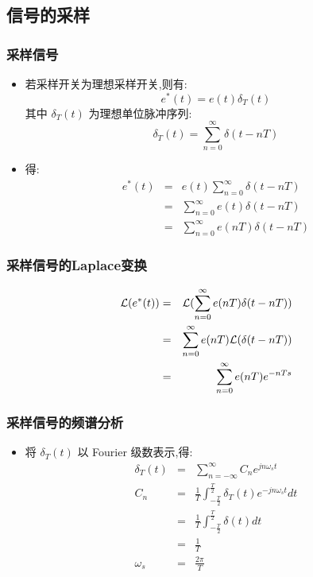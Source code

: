 \documentclass[table]{article}
\begin{document}
\subsection{信号的采样}
\label{sec-2-1}
\begin{frame}
\frametitle{采样信号}
\label{sec-2-1-1}

\begin{itemize}
\item <2->若采样开关为理想采样开关,则有:  
       	\[e^*(t)=e(t)\delta_T(t)\]
      其中  $\delta_T(t)$  为理想单位脉冲序列:  
	       \[\delta_T(t)=\sum_{n=0}^{\infty}\delta(t-nT)\]
\item <3->得:
      \begin{eqnarray*}
      e^{*}(t) & = & e(t)\sum_{n=0}^{\infty}\delta(t-nT) \\
       	&=&  \sum_{n=0}^{\infty}e(t)\delta(t-nT) \\
       	&=&  \sum_{n=0}^{\infty}e(nT)\delta(t-nT) 
      \end{eqnarray*}
\end{itemize}
\end{frame}
\begin{frame}
\frametitle{采样信号的Laplace变换}
\label{sec-2-1-2}

      \begin{eqnarray*}
      {\cal L}(e^{*}(t)) & =  & {\cal L}( \sum_{n=0}^{\infty}e(nT)\delta(t-nT) )\\
      &=&  \sum_{n=0}^{\infty}e(nT){\cal L}(\delta(t-nT) )\\
      &=&  \sum_{n=0}^{\infty}e(nT)e^{-nTs}
      \end{eqnarray*}
\end{frame}
\begin{frame}
\frametitle{采样信号的频谱分析}
\label{sec-2-1-3}

\begin{itemize}
\item <2->将  $\delta_T(t)$  以 Fourier 级数表示,得: 
       \begin{eqnarray*}
       \delta_T(t) & = &\sum_{n=-\infty}^{\infty}C_n e^{jn\omega_s t} \\
       C_n &=&\frac{1}{T}\int_{-\frac{T}{2}}^{\frac{T}{2}}\delta_T(t)e^{-jn\omega_s t}dt \\
         &=&\frac{1}{T}\int_{-\frac{T}{2}}^{\frac{T}{2}}\delta(t)dt \\ 
         &=& \frac{1}{T} \\
       \omega_s &=& \frac{2\pi}{T} 
     \end{eqnarray*}
\end{itemize}
\end{frame}
\end{document}
